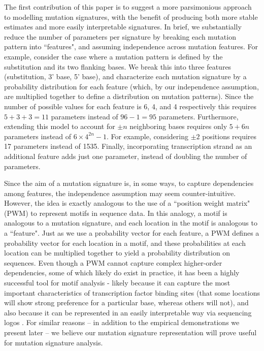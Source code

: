 \documentclass[10pt,letterpaper]{article}
\begin{document}


The first contribution of this paper is to suggest
a more parsimonious approach to modelling 
mutation signatures, with the benefit of producing both more stable estimates and more easily interpretable signatures.
In brief, we substantially reduce the number of parameters
per signature by breaking each mutation pattern into 
``features", and assuming independence
across mutation features. For example, consider
the case where a mutation pattern is defined by the substitution and its two flanking bases. We break this into three features (substitution,
3' base, 5' base), and characterize each mutation
signature by a probability distribution for each feature
(which, by our independence assumption, are multiplied
together to define a distribution on mutation patterns). Since the number of possible values for each feature is 6, 4, and 4 respectively this requires $5+3+3=11$ parameters instead of $96-1=95$ parameters. Furthermore, extending this model to account for $\pm n$ neighboring bases requires only $5 + 6n$ parameters instead of $6 \times 4^{2n} - 1$. For example,
 considering $\pm 2$ positions requires 17 parameters
 instead of 1535. Finally, incorporating
transcription strand as an additional feature adds just one parameter, instead of doubling the number of parameters.

Since the aim of a mutation signature is, in some ways, to capture dependencies among features, the independence assumption may seem counter-intuitive. However, the
idea is exactly analogous to the use of a ``position weight matrix" (PWM) to represent motifs in sequence data. In this
analogy, a motif is analogous to a mutation signature, and each location in the motif is analogous to a ``feature". Just as we use a probability vector for each feature, a PWM defines a probability vector for each location in a motif,
and these probabilities at each location can be multiplied together to yield a probability
distribution on sequences.
Even though a PWM cannot capture complex 
higher-order dependencies, some of which likely do exist in practice, it has been a highly successful tool for motif
analysis - likely because it can capture the most important characteristics of transcription factor binding sites 
(that some locations will show strong preference for a particular base, whereas others will not), and also
because it can be represented in an easily interpretable way via sequencing logos \cite{pmid2172928}.
For similar reasons -- in addition to the empirical
demonstrations we present later -- we believe our mutation signature representation will prove useful for mutation signature analysis. 
\end{document}
